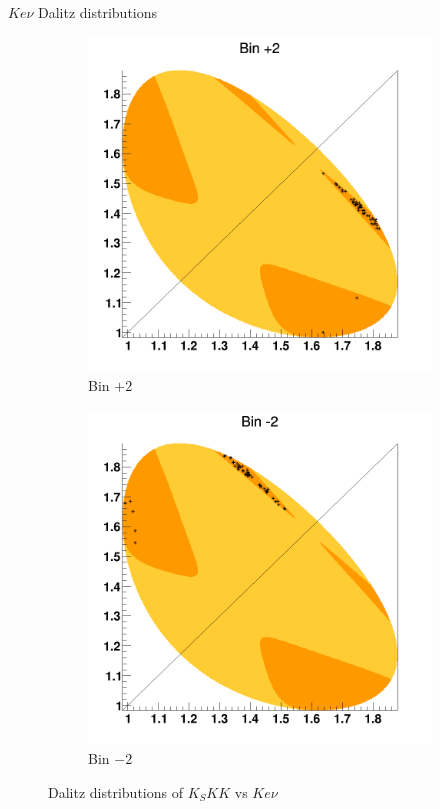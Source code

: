 \documentclass{beamer}
\begin{document}
\begin{frame}{$Ke\nu$ Dalitz distributions}
  \begin{figure}
    \centering
    \begin{subfigure}{0.5\textwidth}
      \centering
      \includegraphics[width=\textwidth]{Dalitzp2.png}
      \caption{Bin $+2$}
    \end{subfigure}%
    \begin{subfigure}{0.5\textwidth}
      \centering
      \includegraphics[width=\textwidth]{Dalitzm2.png}
      \caption{Bin $-2$}
    \end{subfigure}
    \caption{Dalitz distributions of $K_SKK$ vs $Ke\nu$}
  \end{figure}
\end{frame}
\end{document}
